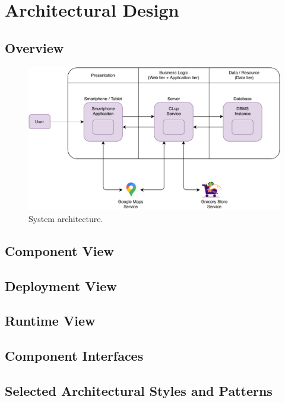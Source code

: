 \chapter{Architectural Design}

\section{Overview}

\begin{figure}[H]
	\centering
	\includegraphics[width=1.0\textwidth]{images/architecture.pdf}
	\caption{System architecture.}
\end{figure}

\section{Component View}

\section{Deployment View}

\section{Runtime View}

\section{Component Interfaces}

\section{Selected Architectural Styles and Patterns}

